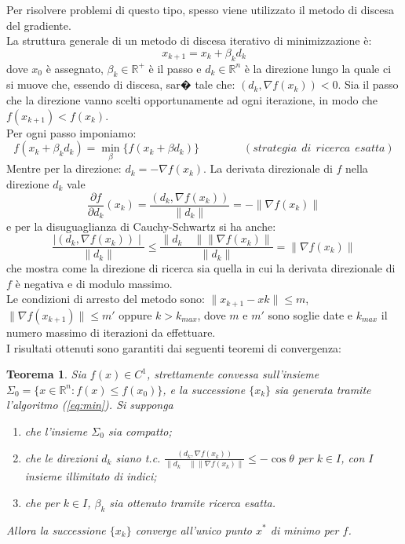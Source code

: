 \documentclass[a4paper,12pt]{report}
\begin{document}
Per risolvere problemi di questo tipo, spesso viene utilizzato il metodo di discesa del gradiente.\cite{an} \\
La struttura generale di un metodo di discesa iterativo di minimizzazione \`e:
\begin{equation}\label{eq:min}
x_{k+1}=x_{k}+\beta_{k}d_{k}
\end{equation}
dove $x_{0}$ \`e assegnato, $\beta_{k}\in \mathbb{R^{+}}$ \`e il passo e $d_{k}\in \mathbb{R}^{n}$ \`e la direzione lungo la quale ci si muove che, essendo di discesa, sar� tale che: $(d_{k},\nabla f(x_{k}))<0$. Sia il passo che la direzione vanno scelti opportunamente ad ogni iterazione, in modo che $f(x_{k+1})<f(x_{k})$.\\
Per ogni passo imponiamo:
$$f(x_{k}+\beta_{k}d_{k})=\min_{\beta}\{f(x_{k}+\beta d_{k})\}\qquad \qquad (strategia\: \: di\: \: ricerca\: \: esatta)$$
Mentre per la direzione: $d_{k}=-\nabla f(x_{k})$. La derivata direzionale di $f$ nella direzione $d_{k}$ vale $$\frac{\partial f}{\partial d_{k}}(x_{k})=\frac{(d_{k},\nabla f(x_{k}))}{\parallel d_{k}\parallel}=-\parallel \nabla f(x_{k})\parallel$$ e per la disuguaglianza di Cauchy-Schwartz si ha anche: $$\frac{\mid (d_{k},\nabla f(x_{k}))\mid}{\parallel d_{k}\parallel}\leq \frac{\parallel d_{k}\quad \parallel \parallel \nabla f(x_{k})\parallel}{\parallel d_{k}\parallel}=\parallel \nabla f(x_{k})\parallel$$ che mostra come la direzione di ricerca sia quella in cui la derivata direzionale di $f$ \`e negativa e di modulo massimo.\\
Le condizioni di arresto del metodo sono: $\parallel x_{k+1}-x{k}\parallel \leq m$, $\parallel \nabla f(x_{k+1})\parallel \leq m\prime$ oppure $k>k_{max}$, dove $m$ e $m\prime$ sono soglie date e $k_{max}$ il numero massimo di iterazioni da effettuare.\\
I risultati ottenuti sono garantiti dai seguenti teoremi di convergenza:
\newtheorem{teo}{Teorema}
\begin{teo}
Sia $f(x)\in C^{1}$, strettamente convessa sull'insieme $\Sigma_{0}=\{x\in\mathbb{R}^{n}:f(x)\leq f(x_{0})\}$, e la successione $\{x_{k}\}$ sia generata tramite l'algoritmo (\ref{eq:min}). Si supponga
\begin{enumerate}
\item che l'insieme $\Sigma_{0}$ sia compatto;
\item che le direzioni $d_{k}$ siano t.c. $\frac{(d_{k},\nabla f(x_{k}))}{\parallel d_{k}\quad \parallel \parallel \nabla f(x_{k})\parallel}\leq - \cos \theta$ per $k\in \textit{I}$, con $\textit{I}$ insieme illimitato di indici;
\item che per $k\in \textit{I}$, $\beta_{k}$ sia ottenuto tramite ricerca esatta.
\end{enumerate}
Allora la successione $\{x_{k}\}$ converge all'unico punto $x^{*}$ di minimo per $f$.
\end{teo}
\end{document}
